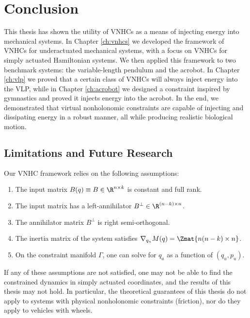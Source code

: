 

\chapter{Conclusion}\label{ch:conclusion}

This thesis has shown the utility of VNHCs as a means of injecting energy into
mechanical systems.
In Chapter \ref{ch:vnhcs} we developed the framework of VNHCs for underactuated
mechanical systems, with a focus on VNHCs for simply actuated Hamiltonian
systems.
We then applied this framework to two benchmark systems: the variable-length
pendulum and the acrobot.
In Chapter \ref{ch:vlp} we proved that a certain class of VNHCs will always
inject energy into the VLP, while in Chapter \ref{ch:acrobot} we designed a
constraint inspired by gymnastics and proved it injects energy into the
acrobot.
In the end, we demonstrated that virtual nonholonomic constraints are capable of
injecting and dissipating energy in a robust manner, all while producing
realistic biological motion.

\section{Limitations and Future Research}
Our VNHC framework relies on the following assumptions:
\begin{enumerate}
    \item The input matrix \(B(q) \equiv B \in \R^{n \times k}\) is constant and
        full rank.
    \item The input matrix has a left-annihilator 
        \(B^\perp \in \R^{(n-k)\times n}\). 
    \item The annihilator matrix \(B^\perp\) is right semi-orthogonal.
    \item The inertia matrix of the system satisfies 
        \(\nabla_{q_u}M(q) = \Zmat{n(n-k) \times n}\).
    \item On the constraint manifold \(\Gamma\), one can solve for \(q_a\) as a
        function of \((q_u,p_u)\).
\end{enumerate}
If any of these assumptions are not satisfied, one may not be able to find the
constrained dynamics in simply actuated coordinates, and the results of this
thesis may not hold.
In particular, the theoretical guarantees of this thesis do not apply to systems
with physical nonholonomic constraints (\eg friction), nor do they apply to vehicles
with wheels.

